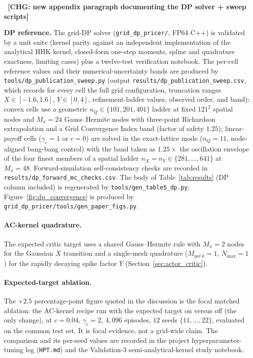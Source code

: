 \documentclass[a4paper,fleqn]{cas-dc}
\newcommand{\hlblock}[1]{\par\noindent
    \colorbox{chgyellow}{\parbox{\dimexpr\linewidth-2\fboxsep\relax}{#1}}\par}
\newcommand{\hlpar}[2]{\hlblock{\textbf{#1} #2}}
\newcommand{\hlblock}[1]{#1}
\newcommand{\hlpar}[2]{\paragraph{#1} #2}
\newcommand{\chg}[1]{{\normalfont\bfseries\color{red}~[CHG: \textsf{\footnotesize #1}]~}}
\newcommand{\chg}[1]{}
\begin{document}
\chg{new appendix paragraph documenting the DP solver + sweep scripts}\hlpar{DP reference.}{The grid-DP solver (\texttt{grid\_dp\_pricer/}, FP64 C++) is validated by a unit suite (kernel parity against an independent implementation of the analytical HHK kernel, closed-form one-step moments, spline and quadrature exactness, limiting cases) plus a twelve-test verification notebook. The per-cell reference values and their numerical-uncertainty bands are produced by \texttt{tools/\allowbreak dp\_\allowbreak publication\_\allowbreak sweep.py} (output \texttt{results/\allowbreak dp\_\allowbreak publication\_\allowbreak sweep.csv}, which records for every cell the full grid configuration, truncation ranges $X\in[-1.6,1.6]$, $Y\in[0,4]$, refinement-ladder values, observed order, and band): convex cells use a geometric $n_Q\in\{101,201,401\}$ ladder at fixed $121^2$ spatial nodes and $M_x=24$ Gauss--Hermite nodes with three-point Richardson extrapolation and a Grid Convergence Index band (factor of safety $1.25$); linear-payoff cells ($\gamma_c=1$ or $c=0$) are solved in the exact-lattice mode ($n_Q=11$, node-aligned bang-bang control) with the band taken as $1.25\times$ the oscillation envelope of the four finest members of a spatial ladder $n_X=n_Y\in\{281,\dots,641\}$ at $M_x=48$. Forward-simulation self-consistency checks are recorded in \texttt{results/\allowbreak dp\_\allowbreak forward\_\allowbreak mc\_\allowbreak checks.csv}. The body of Table~\ref{tab:results} (DP column included) is regenerated by \texttt{tools/\allowbreak gen\_\allowbreak table5\_\allowbreak dp.py}; Figure~\ref{fig:dp_convergence} is produced by \texttt{grid\_\allowbreak dp\_\allowbreak pricer/\allowbreak tools/\allowbreak gen\_\allowbreak paper\_\allowbreak figs.py}.}

\paragraph{AC-kernel quadrature.} The expected critic target uses a shared Gauss--Hermite rule with $M_x=2$ nodes for the Gaussian $X$ transition and a single-mesh quadrature ($M_{\mathrm{per}\,k}=1$, $N_{\max}=1$) for the rapidly decaying spike factor $Y$ (Section~\ref{sec:actor_critic}).

\paragraph{Expected-target ablation.} The $+2.5$ percentage-point figure quoted in the discussion is the focal matched ablation: the AC-kernel recipe run with the expected target on versus off (the only change), at $c=0.04$, $\gamma_c=2$, $4{,}096$ episodes, $12$ seeds $\{11,\dots,22\}$, evaluated on the common test set. It is focal evidence, not a grid-wide claim. The comparison and its per-seed values are recorded in the project hyperparameter-tuning log (\texttt{HPT.md}) and the Validation-3 semi-analytical-kernel study notebook.
\end{document}
